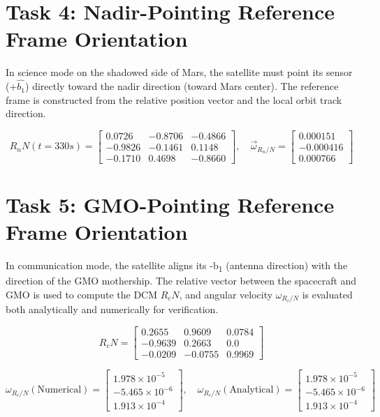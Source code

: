 \documentclass[conf]{article}
\begin{document}
\section{Task 4: Nadir-Pointing Reference Frame Orientation}
In science mode on the shadowed side of Mars, the satellite must point its sensor (+$\hat{b_1}$) directly toward the nadir direction (toward Mars center). The reference frame is constructed from the relative position vector and the local orbit track direction.

\[
R_nN(t = 330s) = 
\begin{bmatrix}
0.0726 & -0.8706 & -0.4866 \\
-0.9826 & -0.1461 & 0.1148 \\
-0.1710 & 0.4698 & -0.8660
\end{bmatrix}, \quad
\vec{\omega}_{R_n/N} = 
\begin{bmatrix}
0.000151 \\ -0.000416 \\ 0.000766
\end{bmatrix}
\]

\section{Task 5: GMO-Pointing Reference Frame Orientation}
In communication mode, the satellite aligns its -b\textsubscript{1} (antenna direction) with the direction of the GMO mothership. The relative vector between the spacecraft and GMO is used to compute the DCM $R_cN$, and angular velocity $\omega_{R_c/N}$ is evaluated both analytically and numerically for verification.

\[
R_cN =
\begin{bmatrix}
0.2655 & 0.9609 & 0.0784 \\
-0.9639 & 0.2663 & 0.0 \\
-0.0209 & -0.0755 & 0.9969
\end{bmatrix}
\]

\[
\omega_{R_c/N} (\text{Numerical}) =
\begin{bmatrix}
1.978 \times 10^{-5} \\
-5.465 \times 10^{-6} \\
1.913 \times 10^{-4}
\end{bmatrix}, \quad
\omega_{R_c/N} (\text{Analytical}) =
\begin{bmatrix}
1.978 \times 10^{-5} \\
-5.465 \times 10^{-6} \\
1.913 \times 10^{-4}
\end{bmatrix}
\]
\end{document}
